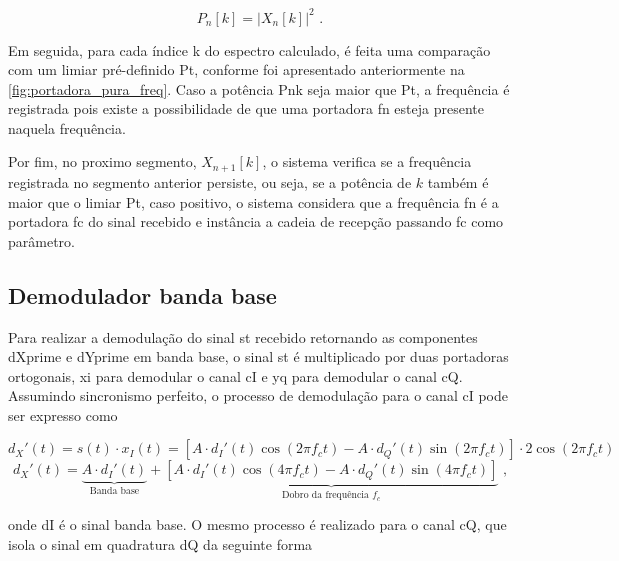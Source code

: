 \vspace{-0.4em}
\begin{equation}
    P_n[k] = |X_n[k]|^2 \text{ .}
\end{equation}

Em seguida, para cada índice \gls{k} do espectro calculado, é feita uma comparação com um limiar pré-definido \gls{Pt}, conforme foi apresentado anteriormente na \autoref{fig:portadora_pura_freq}. Caso a potência \gls{Pnk} seja maior que \gls{Pt}, a frequência é registrada pois existe a possibilidade de que uma portadora \gls{fn} esteja presente naquela frequência. 

Por fim, no proximo segmento, $X_{n+1}[k]$, o sistema verifica se a frequência registrada no segmento anterior persiste, ou seja, se a potência de $k$ também é maior que o limiar \gls{Pt}, caso positivo, o sistema considera que a frequência \gls{fn} é a portadora \gls{fc} do sinal recebido e instância a cadeia de recepção passando \gls{fc} como parâmetro.



\subsection{Demodulador banda base}

Para realizar a demodulação do sinal \gls{st} recebido retornando as componentes \gls{dXprime} e \gls{dYprime} em banda base, o sinal \gls{st} é multiplicado por duas portadoras ortogonais, \gls{xi} para demodular o canal \gls{cI} e \gls{yq} para demodular o canal \gls{cQ}. Assumindo sincronismo perfeito, o processo de demodulação para o canal \gls{cI} pode ser expresso como

\vspace{-1.2em}
\begin{equation}
d_X'(t) = s(t) \cdot x_I(t) = \left[A \cdot d_I'(t) \cos(2\pi f_c t ) - A \cdot d_Q'(t) \sin(2\pi f_c t )\right] \cdot 2\cos(2\pi f_c t )
\end{equation}
\vspace{-0.8em}
\begin{equation}
    d_X'(t) =
    \underbrace{A \cdot d_I'(t)}_{\text{Banda base}} + 
    \underbrace{\left[
        A \cdot d_I'(t) \cos(4\pi f_c t ) 
        - A \cdot d_Q'(t) \sin(4\pi f_c t )
    \right]}_{\text{Dobro da frequência $f_c$}} \text{ ,}
\end{equation}

\noindent onde \gls{dI} é o sinal banda base. O mesmo processo é realizado para o canal \gls{cQ}, que isola o sinal em quadratura \gls{dQ} da seguinte forma

